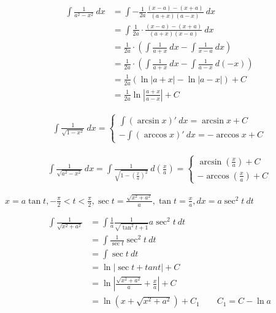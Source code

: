 \begin{align*}
        \int \frac{1}{a^2-x^2}\ dx&=\int -\frac{1}{2a}\frac{(x-a)-(x+a)}{(a+x)(a-x)} \ dx\\
        &=\int \frac{1}{2a}\cdot\frac{(x-a)-(x+a)}{(a+x)(x-a)} \ dx\\
        &=\frac{1}{2a}\cdot\left(\int \frac{1}{a+x} \ dx-\int\frac{1}{x-a} \ dx\right)\\
        &=\frac{1}{2a}\cdot\left(\int \frac{1}{a+x} \ dx-\int\frac{1}{a-x} \ d(-x)\right)\\
        &=\frac{1}{2a}\left(\ln \left|a+x\right|-\ln\left|a-x\right|\right) +C\\
        &=\frac{1}{2a}\ln\left|\frac{a+x}{a-x}\right|+C
\end{align*}

\begin{align*}
        \int \frac{1}{\sqrt{1-x^2}}\ dx=\begin{cases}
                \int (\arcsin x)'\ dx=\arcsin x+C\\
                -\int (\arccos x)'\ dx=-\arccos x+C
        \end{cases}
\end{align*}

\begin{align*}
        \int \frac{1}{\sqrt{a^2-x^2}}\ dx=\int\frac{1}{\sqrt{1-(\frac{x}{a})^2}} \ d(\frac{x}{a})=\begin{cases}
                \arcsin (\frac{x}{a}) +C\\
                -\arccos (\frac{x}{a})+C
        \end{cases}
\end{align*}

\centerline{$x=a\tan t,-\frac{\pi}{2}<t<\frac{\pi}{2},\sec t=\frac{\sqrt{x^2+a^2}}{a},\tan t=\frac{x}{a},dx=a\sec^2t\ dt$}
\vspace{-6mm}
\begin{align*}
        \int \frac{1}{\sqrt{x^2+a^2}}&=\int\frac{1}{a} \frac{1}{\sqrt{\tan^2t+1}}a\sec^2t\ dt\\
        &=\int \frac{1}{\sec t}\sec^2t\ dt\\
        &=\int \sec t \ dt\\
        &=\ln\left|\sec t+ tan t\right|+C\\
        &=\ln\left|\frac{\sqrt{x^2+a^2}}{a}+ \frac{x}{a}\right|+C\\
        &=\ln(x+\sqrt{x^2+a^2})+C_1\qquad C_1=C-\ln a
\end{align*}

